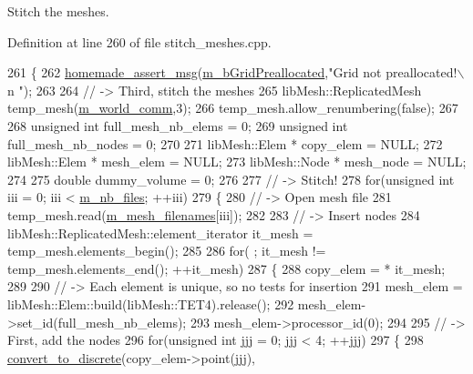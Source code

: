 Stitch the meshes. 



Definition at line 260 of file stitch\+\_\+meshes.\+cpp.


\begin{DoxyCode}
261 \{
262     \hyperlink{common__header_8h_a593ccc80b790b2268653fcf6597bf451}{homemade\_assert\_msg}(\hyperlink{classcarl_1_1_stitch___meshes_aa21268c25f5ca61baeed4744b053e2b6}{m\_bGridPreallocated},\textcolor{stringliteral}{"Grid not preallocated!\(\backslash\)n
      "});
263 
264     \textcolor{comment}{// -> Third, stitch the meshes}
265     libMesh::ReplicatedMesh temp\_mesh(\hyperlink{classcarl_1_1_stitch___meshes_a7a19535c9488135f3fb68f18a04a9442}{m\_world\_comm},3);
266     temp\_mesh.allow\_renumbering(\textcolor{keyword}{false});
267 
268     \textcolor{keywordtype}{unsigned} \textcolor{keywordtype}{int} full\_mesh\_nb\_elems = 0;
269     \textcolor{keywordtype}{unsigned} \textcolor{keywordtype}{int} full\_mesh\_nb\_nodes = 0;
270 
271     libMesh::Elem * copy\_elem = NULL;
272     libMesh::Elem * mesh\_elem = NULL;
273     libMesh::Node * mesh\_node = NULL;
274 
275     \textcolor{keywordtype}{double} dummy\_volume = 0;
276 
277     \textcolor{comment}{// -> Stitch!}
278     \textcolor{keywordflow}{for}(\textcolor{keywordtype}{unsigned} \textcolor{keywordtype}{int} iii = 0; iii < \hyperlink{classcarl_1_1_stitch___meshes_a01c131c2e0c83ef1642326f6ea4f97d2}{m\_nb\_files}; ++iii)
279     \{
280         \textcolor{comment}{// -> Open mesh file}
281         temp\_mesh.read(\hyperlink{classcarl_1_1_stitch___meshes_afc9fe061a29560f4807ed560409eb374}{m\_mesh\_filenames}[iii]);
282 
283         \textcolor{comment}{// -> Insert nodes}
284         libMesh::ReplicatedMesh::element\_iterator it\_mesh = temp\_mesh.elements\_begin();
285 
286         \textcolor{keywordflow}{for}( ; it\_mesh != temp\_mesh.elements\_end(); ++it\_mesh)
287         \{
288             copy\_elem = * it\_mesh;
289 
290             \textcolor{comment}{// -> Each element is unique, so no tests for insertion}
291             mesh\_elem = libMesh::Elem::build(libMesh::TET4).release();
292             mesh\_elem->set\_id(full\_mesh\_nb\_elems);
293             mesh\_elem->processor\_id(0);
294 
295             \textcolor{comment}{// -> First, add the nodes}
296             \textcolor{keywordflow}{for}(\textcolor{keywordtype}{unsigned} \textcolor{keywordtype}{int} jjj = 0; jjj < 4; ++jjj)
297             \{
298                 \hyperlink{classcarl_1_1_stitch___meshes_ab99d52977f1561abb33b4cc5382c179b}{convert\_to\_discrete}(copy\_elem->point(jjj),

\end{DoxyCode}

